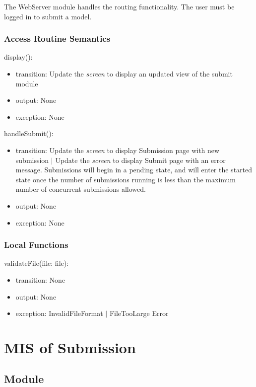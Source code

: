 \documentclass[12pt, titlepage]{article}
\begin{document}
The WebServer module handles the routing functionality.
The user must be logged in to submit a model.

\subsubsection{Access Routine Semantics}

\noindent display():
\begin{itemize}
\item transition: Update the \textit{screen} to display an updated view of the submit module
\item output: None
\item exception: None
\end{itemize}

\noindent handleSubmit():
\begin{itemize}
\item transition: Update the \textit{screen} to display Submission page with new submission $|$ Update the \textit{screen} to display Submit page with an error message. Submissions will begin in a pending state, and will enter the started state once the number of submissions running is less than the maximum number of concurrent submissions allowed.
\item output: None
\item exception: None

\end{itemize}

\subsubsection{Local Functions}

\noindent validateFile(file: file):
\begin{itemize}
\item transition: None
\item output: None
\item exception: InvalidFileFormat $|$ FileTooLarge Error
\end{itemize}


\newpage

\section{MIS of Submission} \label{SubmissionModule}

\subsection{Module}
\end{document}

